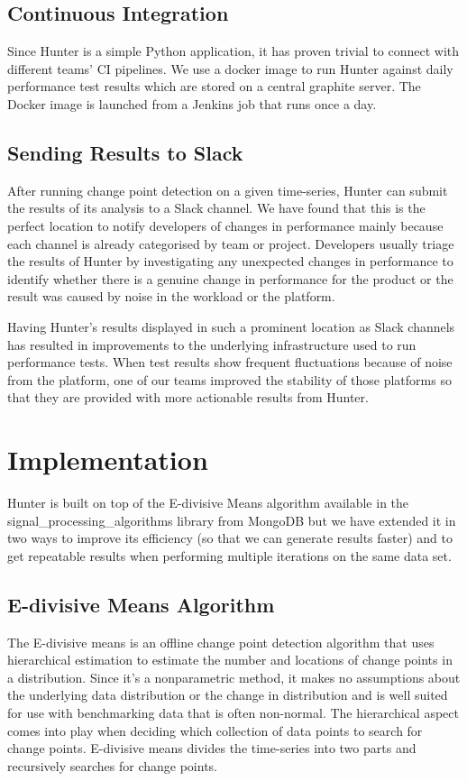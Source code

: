\documentclass[sigconf]{acmart}
\begin{document}
\subsection{Continuous Integration}
Since Hunter is a simple Python application, it has proven trivial to connect with different teams’ CI pipelines. We use a docker image to run Hunter against daily performance test results which are stored on a central graphite server. The Docker image is launched from a Jenkins job that runs once a day.

\subsection{Sending Results to Slack}
After running change point detection on a given time-series, Hunter can submit the results of its analysis to a Slack channel. We have found that this is the perfect location to notify developers of changes in performance mainly because each channel is already categorised by team or project. Developers usually triage the results of Hunter by investigating any unexpected changes in performance to identify whether there is a genuine change in performance for the product or the result was caused by noise in the workload or the platform.

Having Hunter’s results displayed in such a prominent location as Slack channels has resulted in improvements to the underlying infrastructure used to run performance tests. When test results show frequent fluctuations because of noise from the platform, one of our teams improved the stability of those platforms so that they are provided with more actionable results from Hunter.

\section{Implementation}
Hunter is built on top of the E-divisive Means algorithm available in the signal\_processing\_algorithms library from MongoDB \cite{MONGOSIG} but we have extended it in two ways to improve its efficiency (so that we can generate results faster) and to get repeatable results when performing multiple iterations on the same data set.

\subsection{E-divisive Means Algorithm}
The E-divisive means \cite{EDIV} is an offline change point detection algorithm that uses
hierarchical estimation to estimate the number and locations of change points in a distribution.
Since it’s a nonparametric method, it makes no assumptions about the underlying data distribution or
the change in distribution and is well suited for use with benchmarking data that is often
non-normal. The hierarchical aspect comes into play when deciding which collection of data points to
search for change points. E-divisive means divides the time-series into two parts and recursively
searches for change points.
\end{document}
